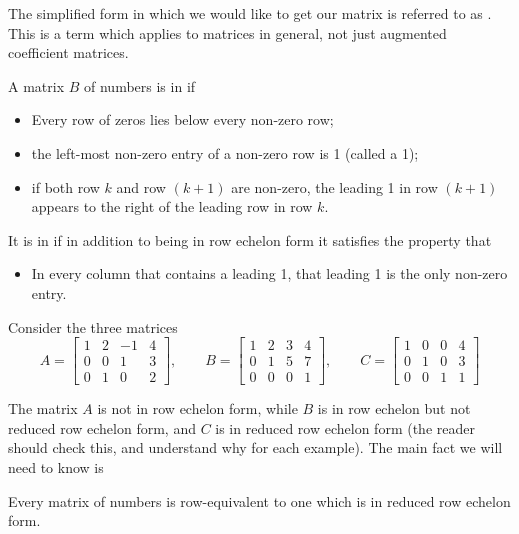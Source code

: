 \documentclass{ximera}
\begin{document}
The simplified form in which we would like to get our matrix is
referred to as . This is a term which
applies to matrices in general, not just augmented coefficient
matrices.

\begin{definition} A matrix $B$ of numbers is in  if
\begin{itemize}
\item Every row of zeros lies below every non-zero row;
\item the left-most non-zero entry of a non-zero row is 1 (called a  1);
\item if both row $k$ and row $(k+1)$ are non-zero, the leading 1 in row $(k+1)$ appears to the right of the leading row in row $k$.
\end{itemize}
It is in  if in addition to being in row echelon form it satisfies the property that
\begin{itemize}
\item In every column that contains a leading 1, that leading 1 is the only non-zero entry.
\end{itemize}
\end{definition}

\begin{example} Consider the three matrices
\[
A = \begin{bmatrix}
1 & 2 & -1 & 4\\
0 & 0 & 1 & 3\\
0 & 1 & 0 & 2
\end{bmatrix},\qquad
B = \begin{bmatrix}
1 & 2 & 3 & 4\\
0 & 1 & 5 & 7\\
0 & 0 & 0 & 1
\end{bmatrix},\qquad
C = \begin{bmatrix}
1 & 0 & 0 & 4\\
0 & 1 & 0 & 3\\
0 & 0 & 1 & 1
\end{bmatrix}
\]
\end{example}

The matrix $A$ is not in row echelon form, while $B$ is in row echelon but not reduced row echelon form, and $C$ is in reduced row echelon form (the reader should check this, and understand why for each example). The main fact we will need to know is

\begin{theorem} Every matrix of numbers is row-equivalent to one which is in reduced row echelon form.
\end{theorem}
\end{document}
